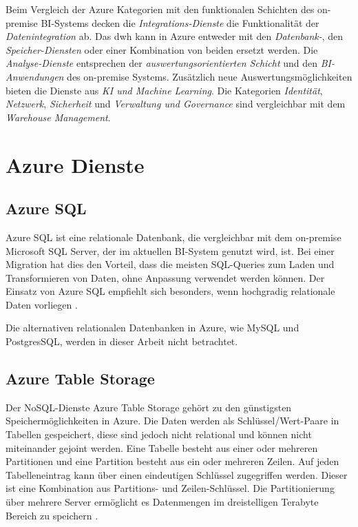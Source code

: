 Beim Vergleich der Azure Kategorien mit den funktionalen Schichten des on-premise BI-Systems decken die \textit{Integrations-Dienste} die  Funktionalität der \textit{Datenintegration} ab. Das \ac{dwh} kann in Azure entweder mit den \textit{Datenbank-}, den \textit{Speicher-Diensten} oder einer Kombination von beiden ersetzt werden. Die \textit{Analyse-Dienste} entsprechen der \textit{auswertungsorientierten Schicht} und den \textit{BI-Anwendungen} des on-premise Systems. Zusätzlich neue Auswertungsmöglichkeiten bieten die Dienste aus \textit{KI und Machine Learning}. Die Kategorien \textit{Identität}, \textit{Netzwerk}, \textit{Sicherheit} und \textit{Verwaltung und Governance} sind vergleichbar mit dem \textit{Warehouse Management}.

\section{Azure Dienste} \label{sec:grundlagen:azure_dienste}

\subsection{Azure SQL} \label{sec:grundlagen:azure_dienste:sql}
Azure SQL ist eine relationale Datenbank, die vergleichbar mit dem on-premise Microsoft SQL Server, der im aktuellen BI-System genutzt wird, ist. Bei einer Migration hat dies den Vorteil, dass die meisten SQL-Queries zum Laden und Transformieren von Daten, ohne Anpassung verwendet werden können. Der Einsatz von Azure SQL empfiehlt sich besonders, wenn hochgradig relationale Daten vorliegen \cite{reagan_azure_2018}. 

Die alternativen relationalen Datenbanken in Azure, wie MySQL und PostgresSQL, werden in dieser Arbeit nicht betrachtet.

\subsection{Azure Table Storage} \label{sec:grundlagen:azure_dienste:tableStorage}
Der NoSQL-Dienste Azure Table Storage gehört zu den günstigsten Speichermöglichkeiten in Azure. Die Daten werden als Schlüssel/Wert-Paare in Tabellen gespeichert, diese sind jedoch nicht relational und können nicht miteinander gejoint werden. Eine Tabelle besteht aus einer oder mehreren Partitionen und eine Partition besteht aus ein oder mehreren Zeilen. Auf jeden Tabelleneintrag kann über einen eindeutigen Schlüssel zugegriffen werden. Dieser ist eine Kombination aus Partitions- und Zeilen-Schlüssel. Die Partitionierung über mehrere Server ermöglicht es Datenmengen im dreistelligen Terabyte Bereich zu speichern \cite{reagan_azure_2018}. 

